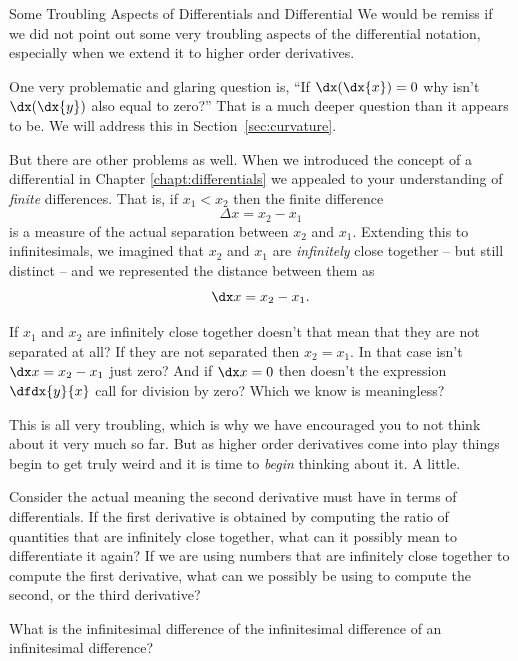 \begin{mynotation}{Some Troubling Aspects of Differentials and Differential}
  We would be remiss if we did not point out  some very troubling
  aspects of the differential notation, especially when we extend it
  to  higher order derivatives. 

  One very problematic and glaring question is, ``If $\dx(\dx{x}) = 0$
  why isn't $\dx(\dx{y})$ also equal to zero?'' That is a much deeper
  question than it appears to be. We will address this in
  Section~\ref{sec:curvature}.

  But there are other problems as well.  When we introduced the
  concept of a differential in Chapter \ref{chapt:differentials} we
  appealed to your understanding of \emph{finite} differences.
  That is, if $x_1\lt{}x_2$ then the finite difference
  $$
  \Delta{}x=x_2-x_1
  $$
  is a measure of the actual separation between $x_2$ and $x_1.$
  Extending this to infinitesimals,  we imagined that $x_2$ and $x_1$ are
  \emph{infinitely} close together -- but still distinct -- and we
  represented the distance between them as
  $$
  \dx x = x_2-x_1.
  $$
  
  If $x_1$ and $x_2$ are infinitely close together doesn't that mean
  that they are not separated at all? If they are not separated then
  $x_2=x_1.$ In that case isn't $\dx x =x_2-x_1$ just zero? And if
  $\dx x =0$ then doesn't the expression $\dfdx{y}{x}$ call for
  division by zero? Which we know is meaningless?

  This is all very troubling, which is why we have encouraged you to
  not think about it very much so far. But as higher order derivatives
  come into play things begin to get truly weird and it is time to
  \emph{begin} thinking about it. A little.

  Consider the actual meaning the second derivative must have in terms
  of differentials. If the first derivative is obtained by computing
  the ratio of quantities that are infinitely close together, what can
  it possibly mean to differentiate it again? If we are using numbers
  that are infinitely close together to compute the first derivative,
  what can we possibly be using to compute the second, or the third
  derivative?

  What is the infinitesimal difference of the infinitesimal difference
  of an infinitesimal difference?


\end{mynotation}
